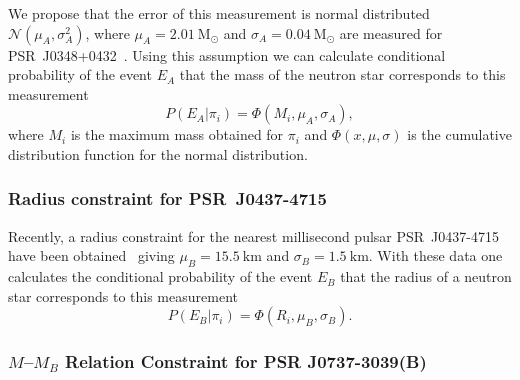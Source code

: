 {We propose that the error of this measurement is normal distributed
$\mathcal{N}(\mu_{A},\sigma_{A}^{2})$, where $\mu_{A}=2.01~\mathrm{M_{\odot}}$
and $\sigma_{A}=0.04~\mathrm{M_{\odot}}$ are measured for PSR~J0348+0432~\cite{Antoniadis:2013pzd}.
Using this assumption we can calculate conditional probability of
the event $E_{A}$ that the mass of the neutron star corresponds to
this measurement
\begin{equation}
P\left(E_{A}\left|\pi_{i}\right.\right)=\Phi(M_{i},\mu_{A},\sigma_{A}),\label{p_anton}
\end{equation}
where $M_{i}$ is the maximum mass obtained for $\pi_{i}$ and $\Phi(x,\mu,\sigma)$
is the cumulative distribution function for the normal distribution.
}


\subsubsection{Radius constraint for PSR~J0437-4715}

{Recently, a radius constraint for the nearest millisecond
pulsar PSR~J0437-4715 have been obtained~\cite{Bogdanov:2012md}
giving $\mu_{B}=15.5~\mathrm{km}$ and $\sigma_{B}=1.5~\mathrm{km}$.
With these data one calculates the conditional probability of the
event $E_{B}$ that the radius of a neutron star corresponds to this
measurement
\begin{equation}
P\left(E_{B}\left|\pi_{i}\right.\right)=\Phi(R_{i},\mu_{B},\sigma_{B}).\label{p_bogdan}
\end{equation}
}


\subsubsection{$M$--$M_{B}$ Relation Constraint for PSR J0737-3039(B)}

